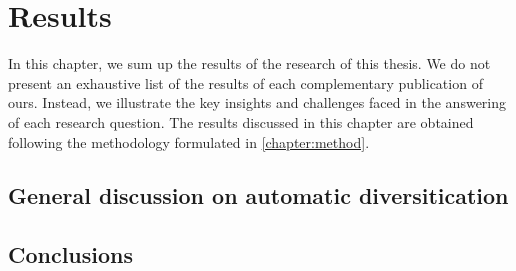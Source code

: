 \chapter{Results} 

In this chapter, we sum up the results of the research of this thesis. We do not present an exhaustive list of the results of each complementary publication of ours. Instead, we illustrate the key insights and challenges faced in the answering of each research question. The results discussed in this chapter are obtained following the methodology formulated in \autoref{chapter:method}.








\section{General discussion on automatic diversitication}

\section{Conclusions}

